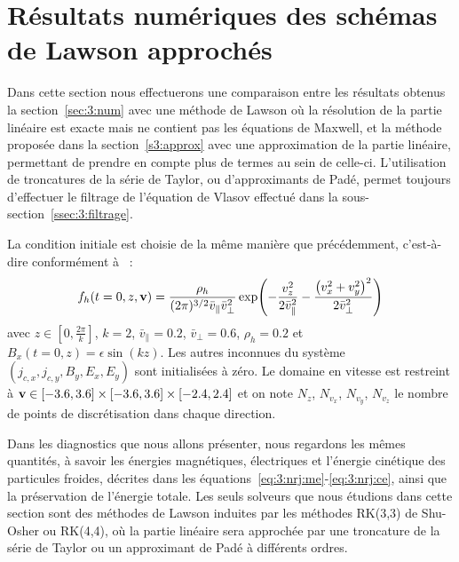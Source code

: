 
\section{Résultats numériques des schémas de Lawson approchés}

Dans cette section nous effectuerons une comparaison entre les résultats obtenus la section~\ref{sec:3:num} avec une méthode de Lawson où la résolution de la partie linéaire est exacte mais ne contient pas les équations de Maxwell, et la méthode proposée dans la section~\ref{s3:approx} avec une approximation de la partie linéaire, permettant de prendre en compte plus de termes au sein de celle-ci. L'utilisation de troncatures de la série de Taylor, ou d'approximants de Padé, permet toujours d'effectuer le filtrage de l'équation de Vlasov effectué dans la sous-section~\ref{ssec:3:filtrage}.

La condition initiale est choisie de la même manière que précédemment, c'est-à-dire conformément à~\cite{Holderied:2020} :
$$
  f_h(t=0,z,\vb{v}) = \frac{\rho_h}{(2\pi)^{3/2}\bar{v}_{\|}\bar{v}_\perp^2}\exp( - \frac{v_z^2}{2\bar{v}_{\|}^2} - \frac{\left( v_x^2 + v_y^2 \right)^2}{2\bar{v}_\perp^2} )
$$
avec $z\in[0,\frac{2\pi}{k}]$, $k=2$, $\bar{v}_{\|}=0.2$, $\bar{v}_\perp=0.6$, $\rho_h=0.2$ et $B_x(t=0,z)=\epsilon\sin(kz)$. Les autres inconnues du système $(j_{c,x},j_{c,y},B_y,E_x,E_y)$ sont initialisées à zéro. Le domaine en vitesse est restreint à $\vb{v}\in[-3.6,3.6]\times[-3.6,3.6]\times[-2.4,2.4]$ et on note $N_z$, $N_{v_x}$, $N_{v_y}$, $N_{v_z}$ le nombre de points de discrétisation dans chaque direction.

Dans les diagnostics que nous allons présenter, nous regardons les mêmes quantités, à savoir les énergies magnétiques, électriques et l'énergie cinétique des particules froides, décrites dans les équations~\eqref{eq:3:nrj:me}-\eqref{eq:3:nrj:ce}, ainsi que la préservation de l'énergie totale. Les seuls solveurs que nous étudions dans cette section sont des méthodes de Lawson induites par les méthodes RK(3,3) de Shu-Osher ou RK(4,4), où la partie linéaire sera approchée par une troncature de la série de Taylor ou un approximant de Padé à différents ordres.



